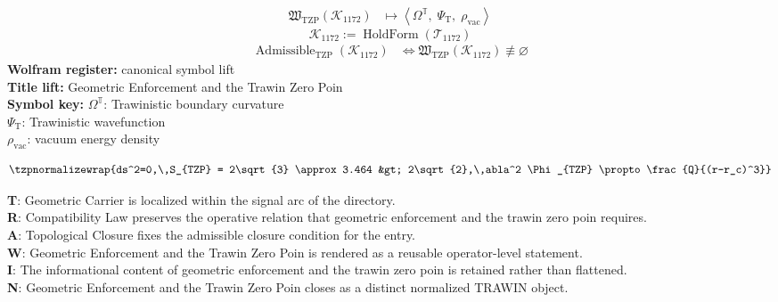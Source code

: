 \noindent
\begin{minipage}[t]{0.48\linewidth}
\begingroup
\small
\[
\begin{aligned}
\mathfrak{W}_{\mathrm{TZP}}\!\left(\mathcal{K}_{1172}\right)
&\longmapsto
\left\langle \Omega^{\mathbb{T}},\; \Psi_{\mathrm{T}},\; \rho_{\mathrm{vac}} \right\rangle
\end{aligned}
\]
\[
\mathcal{K}_{1172}
:=
\operatorname{HoldForm}\!\left(\mathcal{T}_{1172}\right)
\]
\[
\begin{aligned}
\operatorname{Admissible}_{\mathrm{TZP}}\!\left(\mathcal{K}_{1172}\right)
&\Longleftrightarrow
\mathfrak{W}_{\mathrm{TZP}}\!\left(\mathcal{K}_{1172}\right)\not\equiv\varnothing
\end{aligned}
\]
\textbf{Wolfram register:} canonical symbol lift\\
\textbf{Title lift:} Geometric Enforcement and the Trawin Zero Poin\\
\textbf{Symbol key:} \(\Omega^{\mathbb{T}}\): Trawinistic boundary curvature\\ \(\Psi_{\mathrm{T}}\): Trawinistic wavefunction\\ \(\rho_{\mathrm{vac}}\): vacuum energy density
\par
\endgroup
\end{minipage}\hfill
\begin{minipage}[t]{0.48\linewidth}
\[
\tzpnormalizewrap{ds^2=0,\,S_{TZP} = 2\sqrt{3} \approx 3.464 &gt; 2\sqrt{2},\,abla^2 \Phi_{TZP} \propto \frac{Q}{(r-r_c)^3}}
\]

\small
\textbf{T}: Geometric Carrier is localized within the signal arc of the directory.\\
\textbf{R}: Compatibility Law preserves the operative relation that geometric enforcement and the trawin zero poin requires.\\
\textbf{A}: Topological Closure fixes the admissible closure condition for the entry.\\
\textbf{W}: Geometric Enforcement and the Trawin Zero Poin is rendered as a reusable operator-level statement.\\
\textbf{I}: The informational content of geometric enforcement and the trawin zero poin is retained rather than flattened.\\
\textbf{N}: Geometric Enforcement and the Trawin Zero Poin closes as a distinct normalized TRAWIN object.
\normalsize
\end{minipage}

